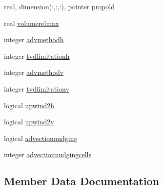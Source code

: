 \begin{DoxyCompactItemize}
real, dimension(\+:,\+:,\+:), pointer \mbox{\hyperlink{structmodulewaterproperties_1_1t__advectiondiffusion__parameters_a4d27d982ee1d32b15678848abb05dcca}{propold}}
\item 
real \mbox{\hyperlink{structmodulewaterproperties_1_1t__advectiondiffusion__parameters_a479068304d77836f07ca1b459ec921fe}{volumerelmax}}
\item 
integer \mbox{\hyperlink{structmodulewaterproperties_1_1t__advectiondiffusion__parameters_afa62d8341d78a8dfeb8624862fae34fc}{advmethodh}}
\item 
integer \mbox{\hyperlink{structmodulewaterproperties_1_1t__advectiondiffusion__parameters_a6b527525cb302fb15c50a5009deb7f6a}{tvdlimitationh}}
\item 
integer \mbox{\hyperlink{structmodulewaterproperties_1_1t__advectiondiffusion__parameters_a667cded60e91f098d128dcd785b3e0c2}{advmethodv}}
\item 
integer \mbox{\hyperlink{structmodulewaterproperties_1_1t__advectiondiffusion__parameters_abfb6ea4a13f9b96f5258a1befc24443f}{tvdlimitationv}}
\item 
logical \mbox{\hyperlink{structmodulewaterproperties_1_1t__advectiondiffusion__parameters_a41cc29b706e24e2804acd265608808db}{upwind2h}}
\item 
logical \mbox{\hyperlink{structmodulewaterproperties_1_1t__advectiondiffusion__parameters_aab551ef52244dba45e0ce73b126458aa}{upwind2v}}
\item 
logical \mbox{\hyperlink{structmodulewaterproperties_1_1t__advectiondiffusion__parameters_a8a4b03910572861c9c976dd8520f3086}{advectionnudging}}
\item 
integer \mbox{\hyperlink{structmodulewaterproperties_1_1t__advectiondiffusion__parameters_a419ce1644962f8149268e6246ef9b5a1}{advectionnudgingcells}}
\end{DoxyCompactItemize}


\subsection{Member Data Documentation}
\mbox{\label{structmodulewaterproperties_1_1t__advectiondiffusion__parameters_a0b08ea3efc549f694ed6fdffd6c678aa}} 
